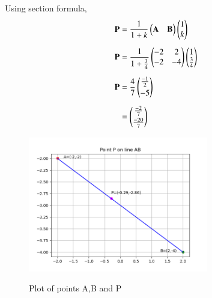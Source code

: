 \documentclass[journal]{IEEEtran}
\begin{document}
Using section formula, 
\begin{align}
	\mathbf{P}&=\frac{1}{1 + k}\begin{pmatrix}\mathbf{A} & \mathbf{B}\end{pmatrix}\begin{pmatrix}1 \\ k\end{pmatrix}\\[5pt]
	\mathbf{P}&=\frac{1}{1+\frac{3}{4}}\begin{pmatrix}-2 & 2\\-2 & -4\end{pmatrix}\begin{pmatrix}1 \\ \frac{3}{4}\end{pmatrix}\\[5pt]
	\mathbf{P}&=\frac{4}{7}\begin{pmatrix}\frac{-1}{2} \\[2 pt] -5\end{pmatrix}\\[5pt]
	&=\begin{pmatrix}\frac{-2}{7} \\[2pt] \frac{-20}{7}\end{pmatrix}
\end{align}
	\newpage
	\begin{figure}[h!]    
	  \begin{center}
		\includegraphics[width=0.7\textwidth]{Figs/Fig.png}
		\label{Graph}
		  \caption{Plot of points A,B and P}  
	 \end{center}	  
	\end{figure}
\end{document}
